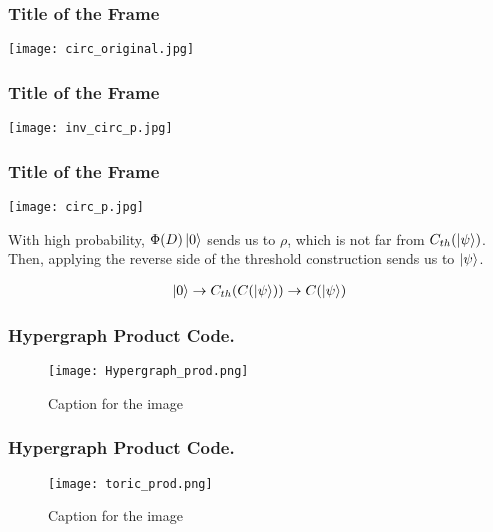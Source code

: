 \documentclass{beamer}
\begin{document}
\begin{frame}
  \frametitle{Title of the Frame}
  \begin{center}
    \texttt{[image: circ\_original.jpg]}
  \end{center}
\end{frame}

\begin{frame}
  \frametitle{Title of the Frame}
  \begin{center}
    \texttt{[image: inv\_circ\_p.jpg]}
  \end{center}
\end{frame}

\begin{frame}
  \frametitle{Title of the Frame}
  \begin{center}
    \texttt{[image: circ\_p.jpg]}
  \end{center}
\end{frame}

\begin{frame}
With high probability, $\Phi(D)\ket{0}$ sends us to $\rho$, which is not far from $C_{th}(\ket{\psi})$. Then, applying the reverse side of the threshold construction sends us to $\ket{\psi}$.


\begin{equation*}
  \begin{split}
    \ket{0} \rightarrow C_{th} ( C (\ket{\psi} ) ) \rightarrow C (\ket{\psi} ) 
  \end{split}
\end{equation*}

\end{frame}

\begin{frame}
  \frametitle{Hypergraph Product Code.}
\begin{figure}[h]
    \centering
    \texttt{[image: Hypergraph\_prod.png]}
    \caption{Caption for the image}
    \label{fig:your-label}
\end{figure}

\end{frame}

\begin{frame}
  \frametitle{Hypergraph Product Code.}

\begin{figure}[h]
    \centering
    \texttt{[image: toric\_prod.png]}
    \caption{Caption for the image}
    \label{fig:your-label}
\end{figure}

\end{frame}
\end{document}
